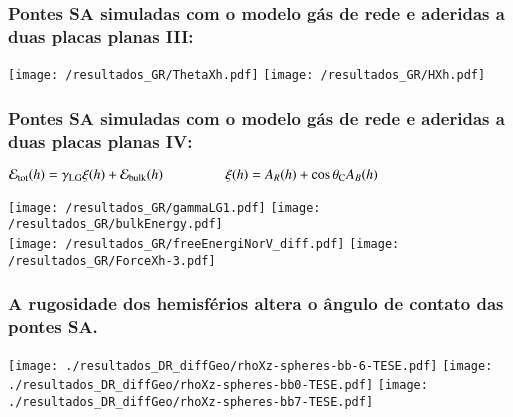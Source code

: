 \documentclass[8pt]{beamer}
\begin{document}
\begin{frame}
\frametitle{Pontes SA simuladas com o modelo gás de rede e aderidas a duas placas planas III:}
	\begin{center}
		\texttt{[image: /resultados\_GR/ThetaXh.pdf]}
  		\texttt{[image: /resultados\_GR/HXh.pdf]}
	\end{center}
\end{frame}

\begin{frame}
\frametitle{Pontes SA simuladas com o modelo gás de rede e aderidas a duas placas planas IV:}
	\begin{center}
	\small  $\mathcal E_{\rm tot}(h) = \gamma_{\rm LG}\xi(h) + \mathcal E_{\rm bulk}(h)~~~~~~~~~~~~~~~~~~\xi(h) = A_R(h) + \cos\theta_{\rm C}A_B(h)$\\
	\end{center}
	\begin{center}
        \texttt{[image: /resultados\_GR/gammaLG1.pdf]}
        \texttt{[image: /resultados\_GR/bulkEnergy.pdf]}\\
      	\texttt{[image: /resultados\_GR/freeEnergiNorV\_diff.pdf]}
      	\texttt{[image: /resultados\_GR/ForceXh-3.pdf]}
	\end{center}
\end{frame}

\begin{frame}
\frametitle{A rugosidade dos hemisférios altera o ângulo de contato das pontes SA.}
		\begin{center}
	        \texttt{[image: ./resultados\_DR\_diffGeo/rhoXz-spheres-bb-6-TESE.pdf]}
			\texttt{[image: ./resultados\_DR\_diffGeo/rhoXz-spheres-bb0-TESE.pdf]}
			\texttt{[image: ./resultados\_DR\_diffGeo/rhoXz-spheres-bb7-TESE.pdf]}
		\end{center}
\end{frame}
\end{document}
